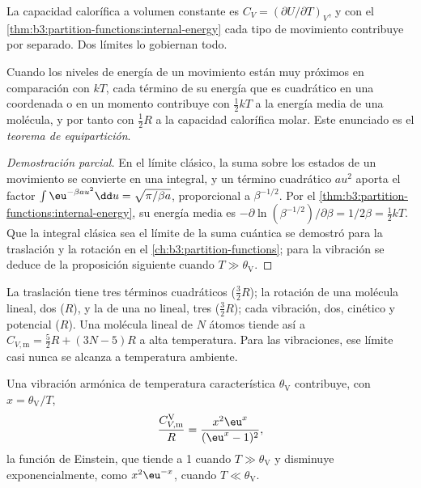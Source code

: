 La capacidad calorífica a volumen constante es $C_V = (\partial U/\partial T)_V$, y con el
\cref{thm:b3:partition-functions:internal-energy} cada tipo de movimiento
contribuye por separado. Dos límites lo gobiernan todo.

\begin{theorem}\label{thm:b3:statistical-thermo-applied:equipartition}
Cuando los niveles de energía de un movimiento están muy próximos en comparación con $kT$, cada
término de su energía que es cuadrático en una coordenada o en un momento contribuye con
$\frac12kT$ a la energía media de una molécula, y por tanto con $\frac12R$ a la capacidad
calorífica molar. Este enunciado es el \emph{teorema de equipartición}.
\end{theorem}

\begin{proof}[Demostración parcial]
En el límite clásico, la suma sobre los estados de un movimiento se convierte en una
integral, y un término cuadrático $a u^2$ aporta el factor $\int\eu^{-\beta au^2}\dd u =
\sqrt{\pi/\beta a}$, proporcional a $\beta^{-1/2}$. Por el
\cref{thm:b3:partition-functions:internal-energy}, su energía media es
$-\partial\ln(\beta^{-1/2})/\partial\beta = 1/2\beta = \frac12kT$. Que la integral clásica sea el
límite de la suma cuántica se demostró para la traslación y la rotación en el
\cref{ch:b3:partition-functions}; para la vibración se deduce de la proposición
siguiente cuando $T \gg \theta_{\mathrm V}$.
\end{proof}

La traslación tiene tres términos cuadráticos ($\frac32R$); la rotación de una molécula
lineal, dos ($R$), y la de una no lineal, tres ($\frac32R$); cada vibración, dos,
cinético y potencial ($R$). Una molécula lineal de $N$ átomos tiende así a
$C_{V,\mathrm m} = \frac52R + (3N - 5)R$ a alta temperatura. Para las vibraciones, ese límite casi nunca
se alcanza a temperatura ambiente.

\begin{proposition}\label{prop:b3:statistical-thermo-applied:cv-vib}
Una vibración armónica de temperatura característica $\theta_{\mathrm V}$ contribuye, con
$x = \theta_{\mathrm V}/T$,
\[
  \frac{C_{V,\mathrm m}^{\mathrm V}}{R} = \frac{x^2\eu^x}{(\eu^x - 1)^2},
\]
la función de Einstein, que tiende a 1 cuando $T \gg \theta_{\mathrm V}$ y disminuye
exponencialmente, como $x^2\eu^{-x}$, cuando $T \ll \theta_{\mathrm V}$.
\end{proposition}

